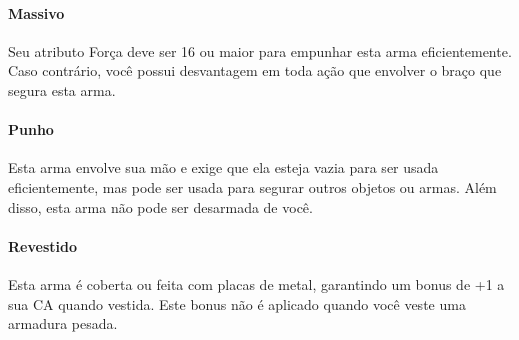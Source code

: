 \documentclass[letterpaper,twocolumn,openany,nodeprecatedcode]{dndbook}
\begin{document}
\paragraph{Massivo} Seu atributo Força deve ser 16 ou maior para empunhar esta arma eficientemente.
Caso contrário, você possui desvantagem em toda ação que envolver o braço que segura esta arma.
\vspace{\baselineskip}

\paragraph{Punho} Esta arma envolve sua mão e exige que ela esteja vazia para ser usada eficientemente, mas pode ser usada
para segurar outros objetos ou armas. Além disso, esta arma não pode ser desarmada de você.
\vspace{\baselineskip}

\paragraph{Revestido} Esta arma é coberta ou feita com placas de metal, garantindo um bonus de +1 a sua CA quando vestida.
Este bonus não é aplicado quando você veste uma armadura pesada.
\end{document}
